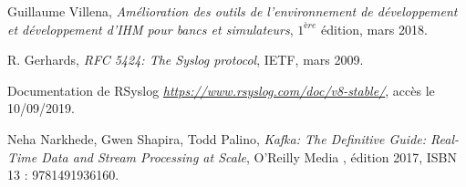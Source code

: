 
\begin{thebibliography}{99}


 Guillaume Villena, \emph{Amélioration des outils de l’environnement de développement et développement d’IHM pour bancs et simulateurs}, $1^{ère}$ édition, mars 2018.

 R. Gerhards, \emph{RFC 5424: The Syslog protocol}, IETF, mars 2009. 

 Documentation de RSyslog \emph{\url{https://www.rsyslog.com/doc/v8-stable/}}, accès le 10/09/2019.

 Neha Narkhede, Gwen Shapira, Todd Palino, \emph{Kafka: The Definitive Guide: Real-Time Data and Stream Processing at Scale},  O'Reilly Media , édition 2017, ISBN 13 : 9781491936160.


\end{thebibliography}